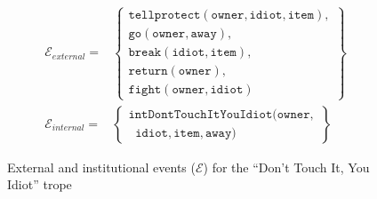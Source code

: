 \documentclass[11pt]{report}
\begin{document}
\begin{figure}[!th]\small
\begin{align}
  \mathcal{E}_{external} = &\left\{\begin{array}{c}
\mathtt{tellprotect(owner, idiot, item)},\\
\mathtt{go(owner, away)},\\
\mathtt{break(idiot, item)},\\
\mathtt{return(owner)},\\
\mathtt{fight(owner, idiot)}
\end{array}
\right\}\label{eq:eobs-hero-full}\\
  \mathcal{E}_{internal} = &\left\{\begin{array}{l}
\mathtt{intDontTouchItYouIdiot(owner,}\\
\;\;\mathtt{idiot, item, away)}
\end{array}\right\}
\label{eq:einst-hero-full}
\end{align}
\caption{External and institutional events ($\mathcal{E}$) for the ``Don't Touch
  It, You Idiot'' trope}\label{fig:sausage-events}
\end{figure}
\end{document}

